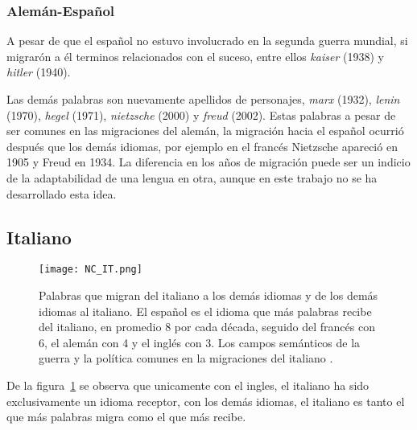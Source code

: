 

  
\subsubsection*{Alemán-Español}%

A pesar de que el español no estuvo involucrado en la segunda guerra mundial, si migrarón a él terminos relacionados con el suceso,  entre ellos \textit{kaiser} (1938) y \textit{hitler} (1940). 

Las demás palabras son nuevamente  apellidos de personajes, \textit{marx} (1932), \textit{lenin} (1970), \textit{hegel} (1971),  \textit{nietzsche} (2000) y \textit{freud} (2002). Estas palabras a pesar de ser comunes en las migraciones del alemán, la migración hacia el español ocurrió después que los demás idiomas, por ejemplo en el francés Nietzsche apareció en 1905 y Freud en 1934. La diferencia en los años de migración puede ser un indicio de la adaptabilidad de una lengua en otra, aunque en este trabajo no se ha desarrollado esta idea. 





\clearpage
\subsection{Italiano}
 
 
\begin{figure}[h!]
	\centering
	\texttt{[image: NC\_IT.png]}
	\caption{Palabras que migran del italiano a los demás idiomas y de los demás idiomas al italiano.  El español es el idioma que más palabras recibe del italiano, en promedio 8 por cada década, seguido del francés con 6,  el alemán con 4 y el inglés con 3. Los campos semánticos de la guerra y la política comunes en la migraciones del italiano .} 
	\label{fig.NC_IT}
\end{figure}



De la figura~\ref{fig.NC_IT} se observa que unicamente con el ingles, el italiano ha sido exclusivamente un idioma receptor,  con los demás idiomas,  el italiano es tanto el que más palabras migra como el que más recibe. 

